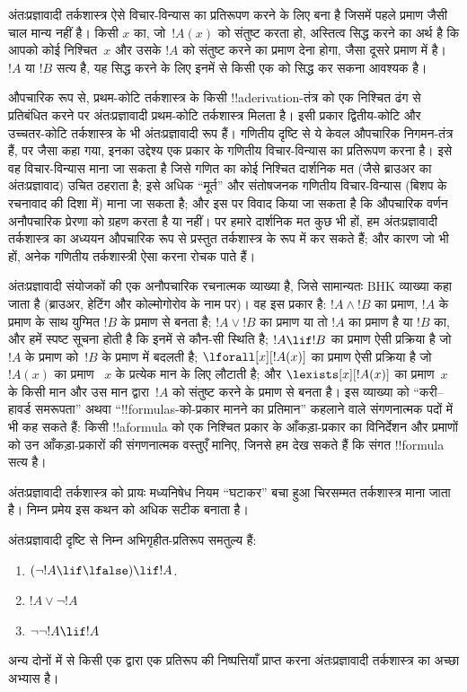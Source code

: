 \documentclass[../../../include/open-logic-section]{subfiles}
\begin{document}
अंतःप्रज्ञावादी तर्कशास्त्र ऐसे विचार-विन्यास का प्रतिरूपण करने के लिए बना
है जिसमें पहले प्रमाण जैसी चाल मान्य नहीं है। किसी $x$ का, जो~$!A(x)$ को
संतुष्ट करता हो, अस्तित्व सिद्ध करने का अर्थ है कि आपको कोई निश्चित~$x$ और उसके
$!A$ को संतुष्ट करने का प्रमाण देना होगा, जैसा दूसरे प्रमाण में है। $!A$ या
$!B$ सत्य है, यह सिद्ध करने के लिए इनमें से किसी एक को सिद्ध कर सकना आवश्यक
है।

औपचारिक रूप से, प्रथम-कोटि तर्कशास्त्र के किसी !!a{derivation}-तंत्र को एक
निश्चित ढंग से प्रतिबंधित करने पर अंतःप्रज्ञावादी प्रथम-कोटि तर्कशास्त्र
मिलता है। इसी प्रकार द्वितीय-कोटि और उच्चतर-कोटि तर्कशास्त्र के भी
अंतःप्रज्ञावादी रूप हैं। गणितीय दृष्टि से ये केवल औपचारिक निगमन-तंत्र हैं,
पर जैसा कहा गया, इनका उद्देश्य एक प्रकार के गणितीय विचार-विन्यास का
प्रतिरूपण करना है। इसे वह विचार-विन्यास माना जा सकता है जिसे गणित का कोई
निश्चित दार्शनिक मत (जैसे ब्राउअर का अंतःप्रज्ञावाद) उचित ठहराता है; इसे
अधिक ``मूर्त'' और संतोषजनक गणितीय विचार-विन्यास (बिशप के रचनावाद की दिशा
में) माना जा सकता है; और इस पर विवाद किया जा सकता है कि औपचारिक वर्णन
अनौपचारिक प्रेरणा को ग्रहण करता है या नहीं। पर हमारे दार्शनिक मत कुछ भी हों,
हम अंतःप्रज्ञावादी तर्कशास्त्र का अध्ययन औपचारिक रूप से प्रस्तुत तर्कशास्त्र
के रूप में कर सकते हैं; और कारण जो भी हों, अनेक गणितीय तर्कशास्त्री ऐसा
करना रोचक पाते हैं।

अंतःप्रज्ञावादी संयोजकों की एक अनौपचारिक रचनात्मक व्याख्या है, जिसे सामान्यतः
BHK व्याख्या कहा जाता है (ब्राउअर, हेटिंग और कोल्मोगोरोव के नाम पर)। वह इस
प्रकार है: $!A
\land !B$ का प्रमाण, $!A$ के प्रमाण के साथ युग्मित $!B$ के
प्रमाण से बनता है; $!A \lor !B$ का प्रमाण या तो $!A$ का प्रमाण है या $!B$
का, और हमें स्पष्ट सूचना होती है कि इनमें से कौन-सी स्थिति है; $!A \lif !B$
का प्रमाण ऐसी प्रक्रिया है जो $!A$ के प्रमाण को~$!B$ के प्रमाण में बदलती
है; $\lforall[x][!A(x)]$ का प्रमाण ऐसी प्रक्रिया है जो $!A(x)$ का प्रमाण
~$x$ के प्रत्येक मान के लिए लौटाती है; और $\lexists[x][!A(x)]$ का प्रमाण~$x$
के किसी मान और उस मान द्वारा~$!A$ को संतुष्ट करने के प्रमाण से बनता है। इस
व्याख्या को ``करी--हावर्ड समरूपता'' अथवा ``!!{formula}s-को-प्रकार मानने का
प्रतिमान'' कहलाने वाले संगणनात्मक पदों में भी कह सकते हैं: किसी !!a{formula}
को एक निश्चित प्रकार के आँकड़ा-प्रकार का विनिर्देशन और प्रमाणों को उन
आँकड़ा-प्रकारों की संगणनात्मक वस्तुएँ मानिए, जिनसे हम देख सकते हैं कि संगत
!!{formula} सत्य है।

अंतःप्रज्ञावादी तर्कशास्त्र को प्रायः मध्यनिषेध नियम ``घटाकर'' बचा हुआ
चिरसम्मत तर्कशास्त्र माना जाता है। निम्न प्रमेय इस कथन को अधिक सटीक बनाता
है।
\begin{thm}
अंतःप्रज्ञावादी दृष्टि से निम्न अभिगृहीत-प्रतिरूप समतुल्य हैं:
\begin{enumerate}
\item $(\lnot !A \lif \lfalse) \lif !A$.
\item $!A \lor \lnot !A$
\item $\lnot \lnot !A \lif !A$
\end{enumerate}
\end{thm}
अन्य दोनों में से किसी एक द्वारा एक प्रतिरूप की निष्पत्तियाँ प्राप्त करना
अंतःप्रज्ञावादी तर्कशास्त्र का अच्छा अभ्यास है।
\end{document}
